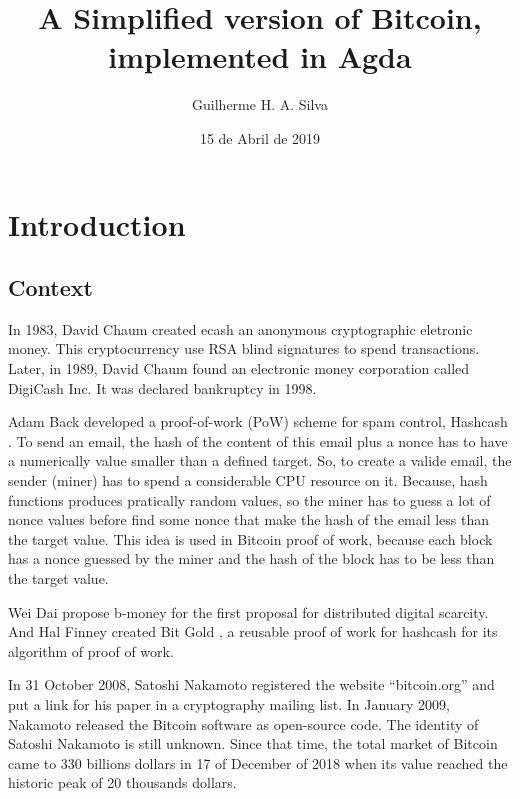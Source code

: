 \documentclass[12pt]{article}
\title{A Simplified version of Bitcoin, implemented in Agda}
\author{Guilherme H. A. Silva}
\date{15 de Abril de 2019}
\begin{document}

\firstpage


\tableofcontents
\pagebreak

\listoffigures
\renewcommand{\thesection}{\arabic{section}}
\section{Introduction}

\subsection{Context} 

In 1983, David Chaum created ecash \cite{panurach1996money} an anonymous cryptographic eletronic money.
This cryptocurrency use RSA blind signatures \cite{chaum1983blind} to spend transactions.
Later, in 1989, David Chaum found an electronic money corporation called DigiCash Inc.
It was declared bankruptcy in 1998.

Adam Back developed a proof-of-work (PoW) scheme for spam control, Hashcash \cite{back2002hashcash}.
To send an email, the hash of the content of this email plus a nonce has to have a numerically value
smaller than a defined target.
So, to create a valide email, the sender (miner) has to spend a considerable CPU resource on it.
Because, hash functions produces pratically random values, so the miner has to guess a lot of nonce
values before find some nonce that make the hash of the email less than the target value.
This idea is used in Bitcoin proof of work, because each block has a nonce guessed by the miner and
the hash of the block has to be less than the target value.

Wei Dai propose b-money \cite{dai1998b} for the first proposal for distributed digital scarcity.
And Hal Finney created Bit Gold \cite{wallace2011rise}, a reusable proof of work for hashcash for
its algorithm of proof of work.

In 31 October 2008, Satoshi Nakamoto registered the website ``bitcoin.org'' and put a link for his
paper \cite{nakamoto2008bitcoin} in a cryptography mailing list.
In January 2009, Nakamoto released the Bitcoin software as open-source code.
The identity of Satoshi Nakamoto is still unknown.
Since that time, the total market of Bitcoin came to 330 billions dollars in 17 of December of 2018
when its value reached the historic peak of 20 thousands dollars.
\end{document}
